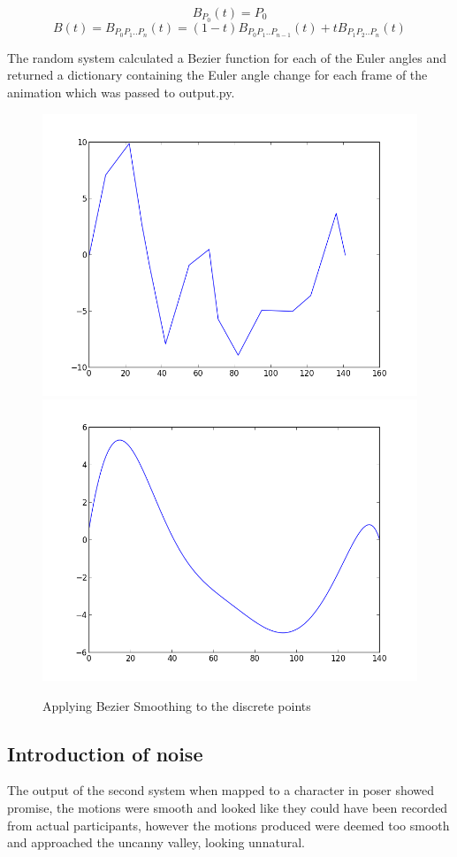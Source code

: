 \documentclass[bsc,frontabs,twoside,singlespacing,parskip,deptreport]{infthesis}
\begin{document}
\begin{equation} 
	B_{P_0}(t) = P_0 
\end{equation}
\begin{equation} 
	B(t) = B_{P_0P_1..P_n}(t) = (1-t) B_{P_0P_1..P_{n-1}}(t) + tB_{P_1P_2..P_n} (t)
\end{equation}

The random system calculated a Bezier function for each of the Euler angles and returned a dictionary containing the Euler angle change for each frame of the animation which was passed to output.py.


\begin{figure}
	\includegraphics[width=.5\textwidth]{figure_1.png}
	\includegraphics[width=.5\textwidth]{figure_2.png}
	\caption{Applying Bezier Smoothing to the discrete points}
\end{figure}

\subsection{Introduction of noise}

The output of the second system when mapped to a character in poser showed promise, the motions were smooth and looked like they could have been recorded from actual participants, however the motions produced were deemed too smooth and approached the uncanny valley, looking unnatural.
\end{document}
